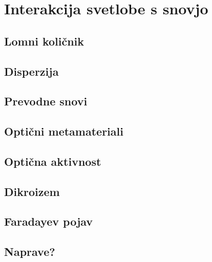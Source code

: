 
\chapter{Interakcija svetlobe s snovjo}
 
\section{Lomni količnik}
\section{Disperzija}
\section{Prevodne snovi}
\section{Optični metamateriali}
\section{Optična aktivnost}
\section{Dikroizem}
\section{Faradayev pojav}
\section{Naprave?}
